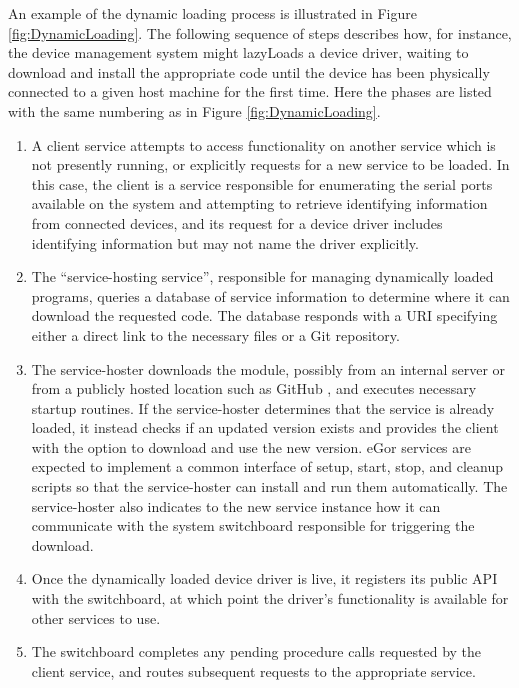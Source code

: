\documentclass[../thesis]{subfiles}
\begin{document}
An example of the dynamic loading process is illustrated in Figure
\ref{fig:DynamicLoading}. The following sequence of steps describes
how, for instance, the device management system might \glspl{lazyLoad} a
device driver, waiting to download and install the appropriate code
until the device has been physically connected to a given host machine
for the first time. Here the phases are listed with the same numbering
as in Figure \ref{fig:DynamicLoading}.

\begin{enumerate}
  \item{
      A client service attempts to access functionality on another
      service which is not presently running, or explicitly requests for
      a new service to be loaded. In this case, the client is a service
      responsible for enumerating the serial ports available on the
      system and attempting to retrieve identifying information from
      connected devices, and its request for a device driver includes
      identifying information but may not name the driver explicitly.
  }
  \item{
      The ``service-hosting service'', responsible for managing
      dynamically loaded programs, queries a database of service
      information to determine where it can download the requested
      code. The database responds with a \gls{URI} specifying either a
      direct link to the necessary files or a Git repository.
  }
  \item{
      The service-hoster downloads the module, possibly from an
      internal server or from a publicly hosted location such as
      GitHub \cite{GitHub}, and executes necessary startup
      routines. If the service-hoster determines that the service is
      already loaded, it instead checks if an updated version exists
      and provides the client with the option to download and use the
      new version. eGor services are expected to implement a common
      interface of setup, start, stop, and cleanup scripts so that the
      service-hoster can install and run them automatically. The
      service-hoster also indicates to the new service instance how it
      can communicate with the system switchboard responsible for
      triggering the download.
  }
  \item{
      Once the dynamically loaded device driver is live, it registers its
      public \gls{API} with the switchboard, at which point the
      driver's functionality is available for other services to use.
  }
  \item{
      The switchboard completes any pending procedure calls requested
      by the client service, and routes subsequent requests to the
      appropriate service.
  }
\end{enumerate}
\end{document}
